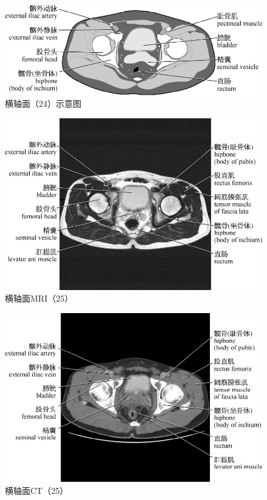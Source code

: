 \begin{figure}[!htbp]
 \centering
 \includegraphics{./images/Image00073.jpg}
 \captionsetup{justification=centering}
 \caption{横轴面（24）示意图}
  \end{figure} 
 \FloatBarrier

\begin{figure}[!htbp]
 \centering
 \includegraphics{./images/Image00074.jpg}
 \captionsetup{justification=centering}
 \caption{横轴面MRI（25）}
  \end{figure} 
 \FloatBarrier

\begin{figure}[!htbp]
 \centering
 \includegraphics{./images/Image00075.jpg}
 \captionsetup{justification=centering}
 \caption{横轴面CT（25）}
  \end{figure} 
 \FloatBarrier

